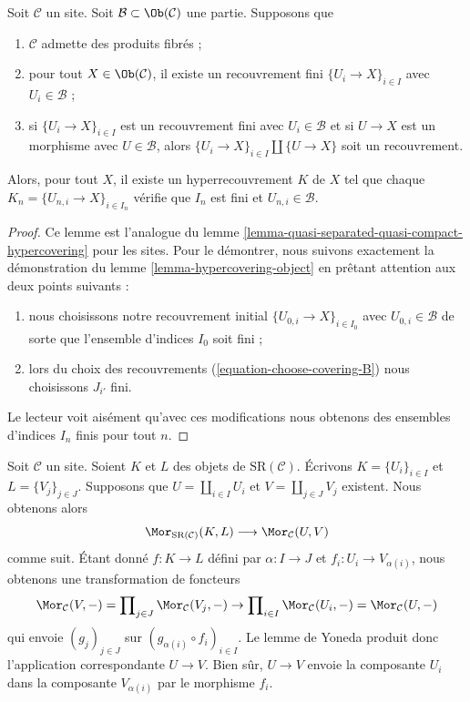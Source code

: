\begin{lemma}
\label{lemma-w-contractible}
Soit $\mathcal{C}$ un site. Soit $\mathcal{B} \subset \Ob(\mathcal{C})$
une partie. Supposons que
\begin{enumerate}
\item $\mathcal{C}$ admette des produits fibrés ;
\item pour tout $X \in \Ob(\mathcal{C})$, il existe un recouvrement fini
$\{U_i \to X\}_{i \in I}$ avec $U_i \in \mathcal{B}$ ;
\item si $\{U_i \to X\}_{i \in I}$ est un recouvrement fini avec
$U_i \in \mathcal{B}$ et si $U \to X$ est un morphisme avec $U \in \mathcal{B}$,
alors $\{U_i \to X\}_{i \in I} \amalg \{U \to X\}$ soit un recouvrement.
\end{enumerate}
Alors, pour tout $X$, il existe un hyperrecouvrement $K$ de $X$
tel que chaque $K_n = \{U_{n, i} \to X\}_{i \in I_n}$ vérifie
que $I_n$ est fini et $U_{n, i} \in \mathcal{B}$.
\end{lemma}

\begin{proof}
Ce lemme est l'analogue du
lemme \ref{lemma-quasi-separated-quasi-compact-hypercovering}
pour les sites. Pour le démontrer, nous suivons exactement la démonstration du
lemme \ref{lemma-hypercovering-object}
en prêtant attention aux deux points suivants :
\begin{enumerate}
\item[(a)] nous choisissons notre recouvrement initial $\{U_{0, i} \to X\}_{i \in I_0}$
avec $U_{0, i} \in \mathcal{B}$ de sorte que l'ensemble d'indices $I_0$ soit fini ;
\item[(b)] lors du choix des recouvrements
(\ref{equation-choose-covering-B})
nous choisissons $J_{i'}$ fini.
\end{enumerate}
Le lecteur voit aisément qu'avec ces modifications nous obtenons
des ensembles d'indices $I_n$ finis pour tout $n$.
\end{proof}

\begin{remark}
\label{remark-taking-disjoint-unions}
Soit $\mathcal{C}$ un site. Soient
$K$ et $L$ des objets de $\text{SR}(\mathcal{C})$.
Écrivons $K = \{U_i\}_{i \in I}$ et $L = \{V_j\}_{j \in J}$.
Supposons que $U = \coprod_{i \in I} U_i$ et $V = \coprod_{j \in J} V_j$
existent. Nous obtenons alors
$$
\Mor_{\text{SR}(\mathcal{C})}(K, L) \longrightarrow \Mor_\mathcal{C}(U, V)
$$
comme suit. Étant donné $f : K \to L$ défini par $\alpha : I \to J$
et $f_i : U_i \to V_{\alpha(i)}$, nous obtenons une transformation de foncteurs
$$
\Mor_\mathcal{C}(V, -) =
\prod\nolimits_{j \in J} \Mor_\mathcal{C}(V_j, -)
\to
\prod\nolimits_{i \in I} \Mor_\mathcal{C}(U_i, -) =
\Mor_\mathcal{C}(U, -)
$$
qui envoie $(g_j)_{j \in J}$ sur
$(g_{\alpha(i)} \circ f_i)_{i \in I}$. Le lemme de Yoneda
produit donc l'application correspondante $U \to V$. Bien sûr, $U \to V$
envoie la composante $U_i$ dans la composante $V_{\alpha(i)}$ par
le morphisme $f_i$.
\end{remark}

